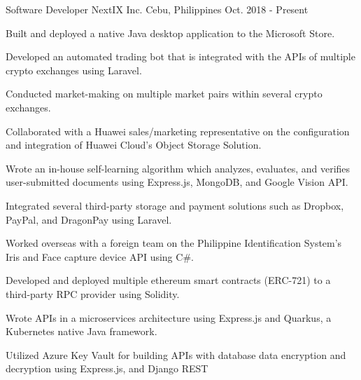 

\begin{cventries}

  \cventry
    {Software Developer} %
    {NextIX Inc.} %
    {Cebu, Philippines} %
    {Oct. 2018 - Present} %
    {
      \begin{cvitems} %
        \item {Built and deployed a native Java desktop application to the Microsoft Store.}
        \item {Developed an automated trading bot that is integrated with the APIs of multiple crypto exchanges using Laravel.}
        \item {Conducted market-making on multiple market pairs within several crypto exchanges.}
        \item {Collaborated with a Huawei sales/marketing representative on the configuration and integration of Huawei Cloud's Object Storage Solution.}
        \item {Wrote an in-house self-learning algorithm which analyzes, evaluates, and verifies user-submitted documents using Express.js, MongoDB, and Google Vision API.}
        \item {Integrated several third-party storage and payment solutions such as Dropbox, PayPal, and DragonPay using Laravel.}
        \item {Worked overseas with a foreign team on the Philippine Identification System's Iris and Face capture device API using C\#.}
        \item {Developed and deployed multiple ethereum smart contracts (ERC-721) to a third-party RPC provider using Solidity.}
        \item {Wrote APIs in a microservices architecture using Express.js and Quarkus, a Kubernetes native Java framework.}
        \item {Utilized Azure Key Vault for building APIs with database data encryption and decryption using Express.js, and Django REST \\ \\ \\ \\ \\}
      \end{cvitems}
    }
\end{cventries}
